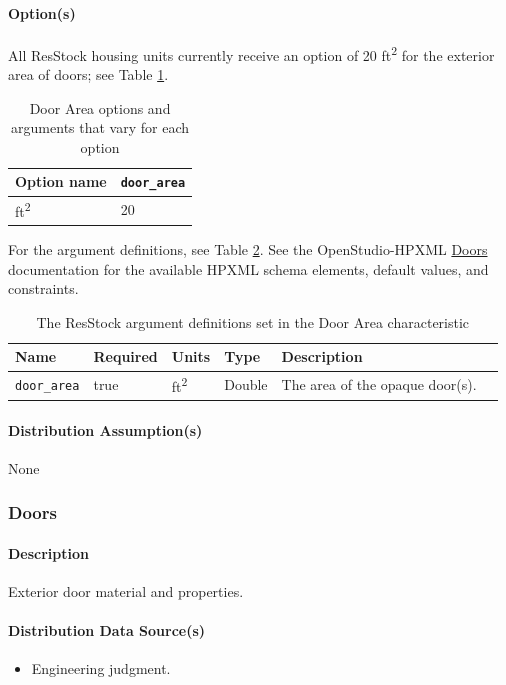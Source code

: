 \paragraph{Option(s)}
All ResStock housing units currently receive an option of 20 ft\textsuperscript{2} for the exterior area of doors; see Table \ref{table:hc_opt_door_area}.
\begin{longtable}[]{|p{3.5cm}|p{3.3cm}|} \caption{Door Area options and arguments that vary for each option} \label{table:hc_opt_door_area} \\  
\toprule\noalign{}
Option name & \texttt{door\_area} \\
\midrule\noalign{}
\endhead
\bottomrule\noalign{}
\endlastfoot
20 ft\textsuperscript{2} & 20 \\
\end{longtable} 
For the argument definitions, see Table \ref{table:hc_arg_def_door_area}. See the OpenStudio-HPXML \href{https://openstudio-hpxml.readthedocs.io/en/v1.8.1/workflow_inputs.html#hpxml-doors}{Doors} documentation for the available HPXML schema elements, default values, and constraints.
\begin{longtable}[]{|p{3.5cm}|p{1.5cm}|p{1.3cm}|p{1.1cm}|p{}|p{3.3cm}|} \caption{The ResStock argument definitions set in the Door Area characteristic} \label{table:hc_arg_def_door_area} \\

\toprule\noalign{}
Name & Required & Units & Type  & Description \\
\midrule\noalign{}
\endhead
\bottomrule\noalign{}
\endlastfoot
\texttt{door\_area} & true & ft\textsuperscript{2} & Double &  The area of the opaque
door(s). \\
\end{longtable}
\paragraph{Distribution Assumption(s)}
None



\subsubsection{Doors}\label{doors}
\paragraph{Description}
Exterior door material and properties.
\paragraph{Distribution Data Source(s)}
\begin{itemize}
 
\item
  Engineering judgment.
\end{itemize}
